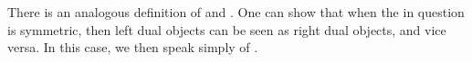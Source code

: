 \begin{remark}\label{rem:left-dualizability}
    There is an analogous definition of  and .
    One can show that when the  in question is symmetric, then left dual objects can be seen as right dual objects, and vice versa.
    In this case, we then speak simply of .
\end{remark}

%
%
%
%
%
%
%
%
%
%
%
%
%
